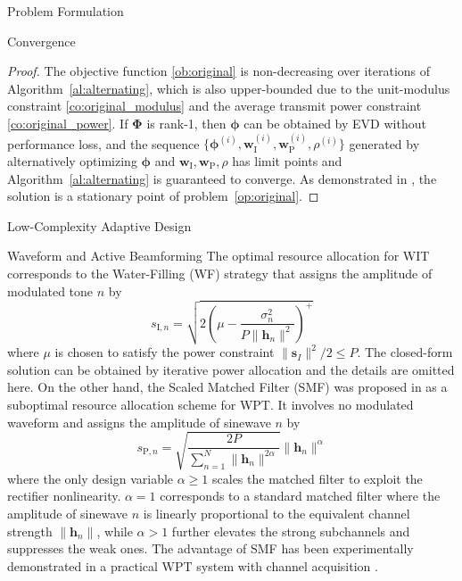 \documentclass[journal]{IEEEtran}
\begin{document}
\begin{section}{Problem Formulation}
\begin{subsection}{Convergence}
			\begin{proof}\label{pf:ao}
				The objective function \eqref{ob:original} is non-decreasing over iterations of Algorithm~\ref{al:alternating}, which is also upper-bounded due to the unit-modulus constraint \eqref{co:original_modulus} and the average transmit power constraint \eqref{co:original_power}. If $\boldsymbol{\Phi}$ is rank-\num{1}, then $\boldsymbol{\phi}$ can be obtained by EVD without performance loss, and the sequence $\{\boldsymbol{\phi}^{(i)},\boldsymbol{w}_{\mathrm{I}}^{(i)},\boldsymbol{w}_{\mathrm{P}}^{(i)},\rho^{(i)}\}$ generated by alternatively optimizing $\boldsymbol{\phi}$ and $\boldsymbol{w}_{\mathrm{I}},\boldsymbol{w}_{\mathrm{P}},\rho$ has limit points and Algorithm~\ref{al:alternating} is guaranteed to converge. As demonstrated in \cite{Grippo2000}, the solution is a stationary point of problem~\eqref{op:original}.
			\end{proof}
		\end{subsection}

		\begin{subsection}{Low-Complexity Adaptive Design}
			\begin{subsubsection}{Waveform and Active Beamforming}
				The optimal resource allocation for WIT corresponds to the Water-Filling (WF) strategy that assigns the amplitude of modulated tone $n$ by
				\begin{equation}
					s_{\mathrm{I}, n} = \sqrt{2\left(\mu - \frac{\sigma_n^2}{P \lVert{\boldsymbol{h}_n}\rVert^2}\right)^+}
				\end{equation}
				where $\mu$ is chosen to satisfy the power constraint $\lVert{\boldsymbol{s}_I}\rVert^2 / 2 \le P$. The closed-form solution can be obtained by iterative power allocation and the details are omitted here. On the other hand, the Scaled Matched Filter (SMF) was proposed in \cite{Clerckx2017} as a suboptimal resource allocation scheme for WPT. It involves no modulated waveform and assigns the amplitude of sinewave $n$ by
				\begin{equation}
					s_{\mathrm{P}, n} = \sqrt{\frac{2 P}{\sum_{n=1}^N \lVert{\boldsymbol{h}_n \rVert^{2 \alpha}}}}\lVert{\boldsymbol{h}_n}\rVert^\alpha
				\end{equation}
				where the only design variable $\alpha \ge 1$ scales the matched filter to exploit the rectifier nonlinearity. $\alpha = 1$ corresponds to a standard matched filter where the amplitude of sinewave $n$ is linearly proportional to the equivalent channel strength $\lVert{\boldsymbol{h}_n}\rVert$, while $\alpha > 1$ further elevates the strong subchannels and suppresses the weak ones. The advantage of SMF has been experimentally demonstrated in a practical WPT system with channel acquisition \cite{Kim2017}.


\end{subsubsection}
\end{subsection}
\end{section}
\end{document}
